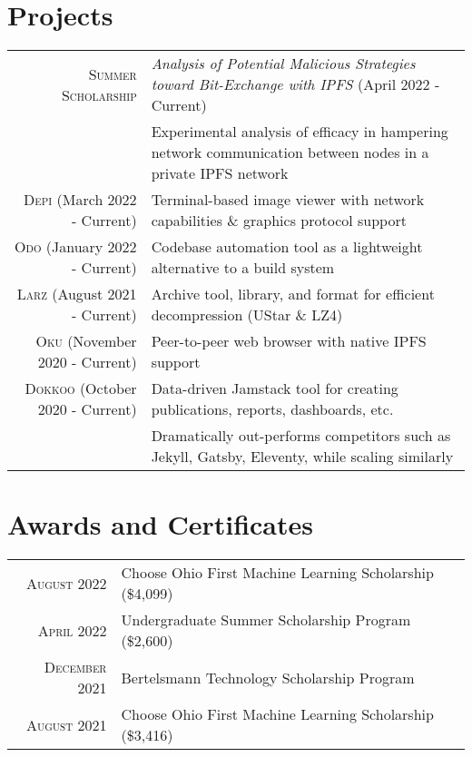 \documentclass[a4paper,10pt]{article} %
\begin{document}

\section{Projects}

\begin{tabular}{rl}
\footnotesize\textsc{Summer Scholarship} & \footnotesize\emph{Analysis of Potential Malicious Strategies toward Bit-Exchange with IPFS} \footnotesize{(April 2022 - Current)}\\
& \footnotesize{Experimental analysis of efficacy in hampering network communication between nodes in a private IPFS network}\\
\textsc{Depi} \footnotesize{(March 2022 - Current)} & Terminal-based image viewer with network capabilities \& graphics protocol support\\
\textsc{Odo} \footnotesize{(January 2022 - Current)} & Codebase automation tool as a lightweight alternative to a build system\\
\textsc{Larz} \footnotesize{(August 2021 - Current)} & Archive tool, library, and format for efficient decompression (UStar \& LZ4)\\
\textsc{Oku} \footnotesize{(November 2020 - Current)} & Peer-to-peer web browser with native IPFS support\\
\textsc{Dokkoo} \footnotesize{(October 2020 - Current)} & \footnotesize{Data-driven Jamstack tool for creating publications, reports, dashboards, etc.}\\
& \footnotesize{Dramatically out-performs competitors such as Jekyll, Gatsby, Eleventy, while scaling similarly}
\end{tabular}


\section{Awards and Certificates}

\footnotesize{\begin{tabular}{rl}
\textsc{August 2022} & Choose Ohio First Machine Learning Scholarship \footnotesize(\$4,099)\normalsize\\
\textsc{April 2022} & Undergraduate Summer Scholarship Program \footnotesize(\$2,600)\\
\textsc{December 2021} & Bertelsmann Technology Scholarship Program\\
\textsc{August 2021} & Choose Ohio First Machine Learning Scholarship \footnotesize(\$3,416)\normalsize\\
\end{tabular}}\normalsize
\end{document}
